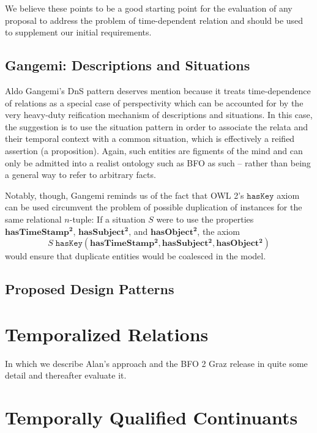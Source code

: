 \documentclass[10pt]{bmc_article}
\newcommand{\mirel}[1]{\ensuremath{\mathrm{\mathbf{#1}}}}
\newcommand{\mclass}[1]{\ensuremath{\mathit{#1}}}
\newcommand{\mrel}[2]{\mirel{#1^#2}}
\newcommand{\mrelb}[1]{\mrel{#1}{2}}
\newenvironment{bmcformat}{\baselineskip20pt\sloppy\setboolean{publ}{false}}{\baselineskip20pt\sloppy}
\begin{document}
\begin{bmcformat}
We believe these points to be a good starting point for the evaluation of
any proposal to address the problem of time-dependent relation and should be
used to supplement our initial requirements.

\subsection*{Gangemi: Descriptions and Situations}
Aldo Gangemi's DnS pattern \cite{Gangemi:DnS} deserves mention because it treats
time-dependence of relations as a special case of perspectivity which can be
accounted for by the very heavy-duty reification mechanism of descriptions and
situations. In this case, the suggestion is to use the situation pattern in
order to associate the relata and their temporal context with a common
situation, which is effectively a reified assertion (a proposition). Again, such
entities are figments of the mind and can only be admitted into a realist
ontology such as BFO as such -- rather than being a general way to refer to
arbitrary facts. 

Notably, though, Gangemi reminds us of the fact that OWL 2's $\mathtt{hasKey}$
axiom can be used circumvent the problem of possible duplication of instances
for the same relational $n$-tuple: If a situation $\mclass{S}$ were to use the properties
$\mrelb{hasTimeStamp}$, $\mrelb{hasSubject}$, and $\mrelb{hasObject}$, the axiom
\begin{equation}
\mclass{S}\;\mathtt{hasKey}(\mrelb{hasTimeStamp}, \mrelb{hasSubject},
\mrelb{hasObject})
\end{equation}
would ensure that duplicate entities would be coalesced in the model.


\subsection*{Proposed Design Patterns}

\section*{Temporalized Relations}

In which we describe Alan's approach and the BFO 2 Graz release in quite some detail and thereafter evaluate it. 


\section*{Temporally Qualified Continuants}


\end{bmcformat}
\end{document}
